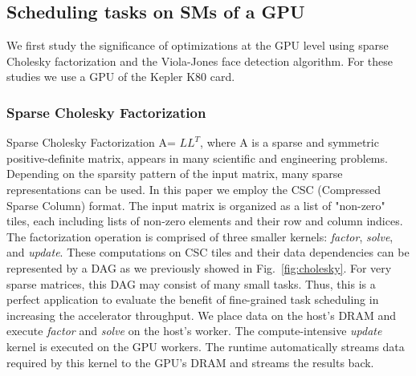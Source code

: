 \subsection{Scheduling tasks on SMs of a GPU}
We first study the significance of optimizations at the GPU level using sparse Cholesky factorization and the Viola-Jones face detection algorithm.
For these studies we use a GPU of the Kepler K80 card.

\subsubsection{Sparse Cholesky Factorization}
Sparse Cholesky Factorization A= $LL^T$, where A is a sparse and symmetric positive-definite matrix,
appears in many scientific and engineering problems.
Depending on the sparsity pattern of the input matrix, many sparse representations can be used.
In this paper we employ the CSC (Compressed Sparse Column) format. 
The input matrix is organized as a list of "non-zero" tiles, each including lists of non-zero elements and their row and column indices.
The factorization operation is comprised of three smaller kernels: {\em factor}, {\em solve}, and {\em update}.
These computations on CSC tiles and their data dependencies can be represented by a DAG as we previously showed in Fig.~\ref{fig:cholesky}. 
For very sparse matrices, this DAG may consist of many small tasks.
Thus, this is a perfect application to evaluate the benefit of fine-grained task scheduling in increasing the accelerator throughput.
We place data on the host's DRAM and execute {\em factor} and {\em solve} on the host's worker.
The compute-intensive {\em update} kernel is executed on the GPU workers.
The runtime automatically streams data required by this kernel to the GPU's DRAM and streams the results back.

